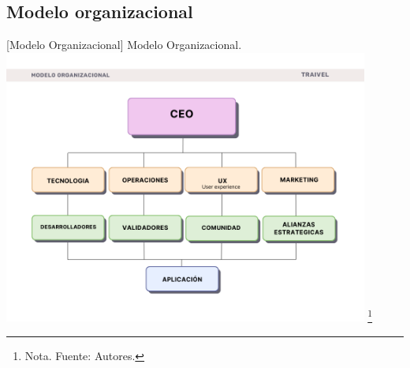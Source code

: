 \subsection{Modelo organizacional}
\vspace{2mm}
        \begin{minipage}{1\textwidth}
        \centering
        [{Modelo Organizacional}]{ Modelo Organizacional.  }
        \label{ModeloOrganizacional}
         \includegraphics[width=0.9\textwidth]{Content/Images/modelo_organizacional.png}
        \footnote{Nota. \textup{Fuente: Autores.}}
\end{minipage}